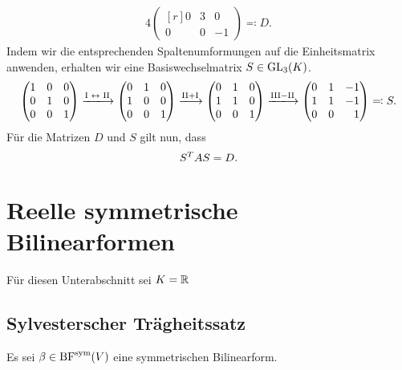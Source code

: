 \begin{example}
\begin{alignat*}{4}
\begin{pmatrix*}[r]
       0 & 3 &  0 \\
       0 & 0 & -1
    \end{pmatrix*}
    \eqqcolon D.
  \end{alignat*}
  Indem wir die entsprechenden Spaltenumformungen auf die Einheitsmatrix anwenden, erhalten wir eine Basiswechselmatrix $S \in \operatorname{GL}_{3}(K)$.
  \[
    \begin{pmatrix*}[r]
      1 & 0 & 0 \\
      0 & 1 & 0 \\
      0 & 0 & 1
    \end{pmatrix*}
    \xlongrightarrow{\text{I $\leftrightarrow$ II}}
    \begin{pmatrix*}[r]
      0 & 1 & 0 \\
      1 & 0 & 0 \\
      0 & 0 & 1
    \end{pmatrix*}
    \xlongrightarrow{\text{II} + \text{I}}
    \begin{pmatrix*}[r]
      0 & 1 & 0 \\
      1 & 1 & 0 \\
      0 & 0 & 1
    \end{pmatrix*}
    \xlongrightarrow{\text{III} - \text{II}}
    \begin{pmatrix*}[r]
      0 & 1 & -1  \\
      1 & 1 & -1  \\
      0 & 0 &  1
    \end{pmatrix*}
    \eqqcolon
    S.
  \]
  Für die Matrizen $D$ und $S$ gilt nun, dass
  \[
      S^T A S
    = D.
  \]

\end{example}





\section{Reelle symmetrische Bilinearformen}

Für diesen Unterabschnitt sei $K = \mathbb{R}$



\subsection{Sylvesterscher Trägheitssatz}

Es sei $\beta \in \operatorname{BF}^{\operatorname{sym}}(V)$ eine symmetrischen Bilinearform.

